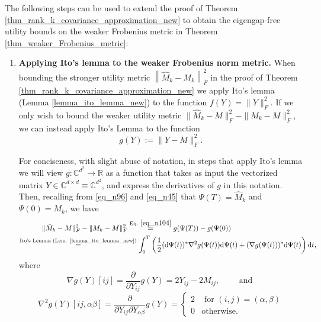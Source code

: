 \documentclass[11pt,letterpaper]{article}
\begin{document}
\noindent
The following steps can be used to extend the proof of Theorem \ref{thm_rank_k_covariance_approximation_new} to obtain the eigengap-free utility bounds on the weaker Frobenius metric in Theorem \ref{thm_weaker_Frobenius_metric}:

\begin{enumerate}
\item {\bf Applying Ito's lemma to the weaker Frobenius norm metric.}
%
%
When bounding the stronger utility metric $\left\|\hat{M}_k -  M_k\right \|_F^2$ in the proof of Theorem \ref{thm_rank_k_covariance_approximation_new} we apply Ito's lemma (Lemma  \ref{lemma_ito_lemma_new}) to the function $f(Y) = \|Y\|_F^2$.  
 If we only wish to bound the weaker utility metric $\|\hat{M}_k - M\|_F^2 - \|M_k - M\|_F^2$, we can instead apply Ito's Lemma to the function
 \begin{equation}\label{eq_n104}
 g(Y) := \|Y - M\|_F^2.
 \end{equation}

   For conciseness, with slight abuse of notation, in steps that apply Ito's lemma we will view $g: \mathbb{C}^{d^2} \rightarrow \mathbb{R}$ as a function that takes as input the vectorized matrix $Y \in \mathbb{C}^{d \times d} \equiv  \mathbb{C}^{d^2}$, and express the derivatives of $g$ in this notation.
   Then, recalling from   \eqref{eq_n96} and \eqref{eq_n45} that $\Psi(T) = \hat{M}_k$ and $\Psi(0) = M_k$, we have
% 
\begin{eqnarray} \label{eq_n105}
 \|\hat{M}_k - M\|_F^2 - \|M_k - M\|_F^2  \stackrel{\textrm{Eq. } \eqref{eq_n104}}{=} g(\Psi(T)) - g(\Psi(0))\qquad \qquad \qquad \qquad \qquad \qquad  \nonumber\\
%
%
\stackrel{\textrm{Ito's Lemma (Lem.  \ref{lemma_ito_lemma_new})}}{=}  \int_0^T  \left( \frac{1}{2} (\mathrm{d}\Psi(t))^\ast  \nabla^2 g(\Psi(t)) \mathrm{d}\Psi(t)   + (\nabla g(\Psi(t)))^\ast \mathrm{d}\Psi(t) \right ) \mathrm{d}t,
\end{eqnarray}
%
%
\color{black}
 where
%
\begin{equation} \label{eq_W2}
\nabla g(Y) [ij] = \frac{\partial}{\partial Y_{ij}} g(Y) = 2Y_{ij} -2M_{ij}, \qquad \textrm{ and }
\end{equation}
%
 \begin{equation*}
 \nabla^2 g(Y)[ij, \alpha \beta] = \frac{\partial}{\partial Y_{ij} \partial Y_{\alpha \beta}} g(Y) = \begin{cases} 2 & \textrm{ for } (i,j)=(\alpha, \beta)\\ 0 & \textrm{otherwise}. \end{cases}
 \end{equation*}
 

\end{enumerate}
\end{document}
